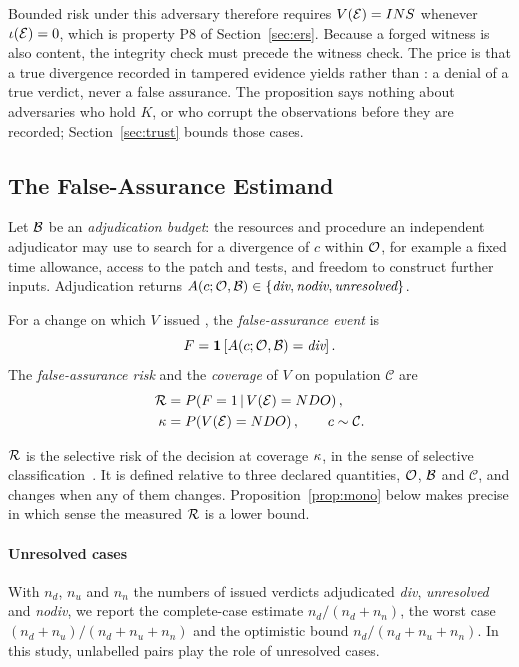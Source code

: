 Bounded risk under this adversary therefore requires $V(\mathcal{E})=INS{}$ whenever $\iota(\mathcal{E})=0$, which is property P8 of Section~\ref{sec:ers}. Because a forged witness is also content, the integrity check must precede the witness check. The price is that a true divergence recorded in tampered evidence yields \INS{} rather than \DIV{}: a denial of a true verdict, never a false assurance. The proposition says nothing about adversaries who hold $K$, or who corrupt the observations before they are recorded; Section~\ref{sec:trust} bounds those cases.

\subsection{The False-Assurance Estimand}
Let $\mathcal{B}$ be an \emph{adjudication budget}: the resources and procedure an independent adjudicator may use to search for a divergence of $c$ within $\mathcal{O}$, for example a fixed time allowance, access to the patch and tests, and freedom to construct further inputs. Adjudication returns $A(c;\mathcal{O},\mathcal{B})\in\{\textit{div},\textit{nodiv},\textit{unresolved}\}$.

\begin{definition}
For a change on which $V$ issued \NDO{}, the \emph{false-assurance event} is
\begin{equation}
F=\mathbf{1}\left[A(c;\mathcal{O},\mathcal{B})=\textit{div}\right].
\label{eq:F}
\end{equation}
The \emph{false-assurance risk} and the \emph{coverage} of $V$ on population $\mathcal{C}$ are
\begin{align}
\mathcal{R}&=P\!\left(F=1\,\middle|\,V(\mathcal{E})=NDO{}\right),\label{eq:R}\\
\kappa&=P\!\left(V(\mathcal{E})=NDO{}\right),\qquad c\sim\mathcal{C}.\label{eq:kappa}
\end{align}
\end{definition}
$\mathcal{R}$ is the selective risk of the \NDO{} decision at coverage $\kappa$, in the sense of selective classification~\cite{elyaniv2010foundations,geifman2017selective}. It is defined relative to three declared quantities, $\mathcal{O}$, $\mathcal{B}$ and $\mathcal{C}$, and changes when any of them changes. Proposition~\ref{prop:mono} below makes precise in which sense the measured $\mathcal{R}$ is a lower bound.

\paragraph*{Unresolved cases} With $n_d$, $n_u$ and $n_n$ the numbers of issued \NDO{} verdicts adjudicated \textit{div}, \textit{unresolved} and \textit{nodiv}, we report the complete-case estimate $n_d/(n_d+n_n)$, the worst case $(n_d+n_u)/(n_d+n_u+n_n)$ and the optimistic bound $n_d/(n_d+n_u+n_n)$. In this study, unlabelled pairs play the role of unresolved cases.

